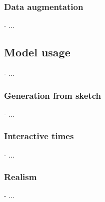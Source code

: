 \subsubsection{Data augmentation}
- ...

\subsection{Model usage}
- ...

\subsubsection{Generation from sketch}
- ...

\subsubsection{Interactive times}
- ...

\subsubsection{Realism}
- ...
